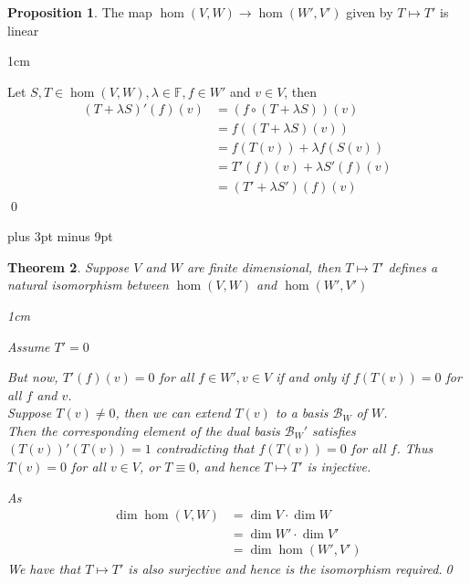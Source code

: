 \documentclass[11pt, a4paper]{report}
\makeatletter
\numberwithin{equation}{section}
\newcommand{\B}{\mathcal{B}}
\newcommand{\F}{\mathbb{F}}
\numberwithin{equation}{subsection}
\theoremstyle{plain}
\newtheorem{thm}{Theorem}[chapter] %
\theoremstyle{definition}
\newtheorem{prop}[thm]{Proposition}
\theoremstyle{remark}
\newtheorem*{prf}{Proof}
\renewenvironment{prf}[1][\proofname]{\par
  \vspace{-\topsep}%
  \normalfont
  \topsep0pt \partopsep0pt %
  \trivlist
  \item[\hskip\labelsep
        \itshape
    #1\@addpunct{.}]\ignorespaces
}{%
  \popQED\endtrivlist\@endpefalse
  \addvspace{6pt plus 6pt} %
}
\newcommand{\pr}[1]{\begin{adjustwidth}{1cm}{} \begin{prf} #1 \end{prf} \end{adjustwidth}}
\makeatother
\begin{document}
\begin{prop}
The map $\hom(V,W) \to \hom(W',V')$ given by $T \mapsto T'$ is linear

\pr{
Let $S,T \in \hom(V,W), \lambda \in \F, f \in W'$ and $v \in V$, then
\begin{align*}
(T + \lambda S)'(f)(v)	&= (f \circ (T + \lambda S))(v)\\
						&= f((T + \lambda S)(v))\\
						&= f(T(v)) + \lambda f( S(v))\\
						&= T'(f)(v) + \lambda S'(f)(v)\\
						&= (T' + \lambda S')(f)(v)
\end{align*}\vspace{-8pt}\qed
}
\end{prop}
\belowdisplayskip=12pt plus 3pt minus 9pt
\begin{thm}
Suppose $V$ and $W$ are finite dimensional, then $T \mapsto T'$ defines a natural isomorphism between $\hom(V,W)$ and $\hom(W',V')$

\pr{
Assume $T' = 0$

But now, $T'(f)(v) = 0$ for all $f \in W', v \in V$ if and only if $f(T(v)) = 0$ for all $f$ and $v$.\\ Suppose $T(v) \neq 0$, then we can extend $T(v)$ to a basis $\B_W$ of $W$.\\ Then the corresponding element of the dual basis $\B_W'$ satisfies $(T(v))'(T(v)) = 1$ contradicting that $f(T(v)) = 0$ for all $f$. Thus $T(v) = 0$ for all $v \in V$, or $T \equiv 0$, and hence $T \mapsto T'$ is injective.

As
\begin{align*}
\dim \hom(V,W)	&= \dim V \cdot \dim W\\
				&= \dim W' \cdot \dim V'\\
				&= \dim \hom(W',V')
\end{align*}
We have that $T \mapsto T'$ is also surjective and hence is the isomorphism required.\qed
}

\end{thm}
\end{document}
